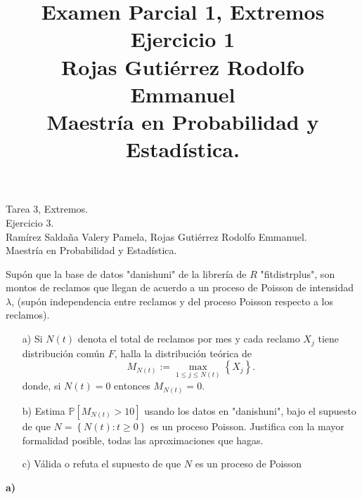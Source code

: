 \documentclass[10.5pt,notitlepage]{article}
\title{Examen Parcial 1, Extremos \\
Ejercicio 1\\
Rojas Gutiérrez Rodolfo Emmanuel\\ 
Maestría en Probabilidad y Estadística.}
\author{}
\newcommand{\PP}{\mathbb{P}}
\newcommand{\kis}[1]{\left\{ #1 \right\}}
\theoremstyle{plain}
\begin{document}
\begin{flushleft}
Tarea 3, Extremos.\\
Ejercicio 3.\\   
Ramírez Saldaña Valery Pamela, Rojas Gutiérrez Rodolfo Emmanuel.\\
Maestría en Probabilidad y Estadística.
\end{flushleft}
\setcounter{exo}{2}
\begin{exo}
Supón que la base de datos "danishuni" de la librería de \(R\) "fitdistrplus", son montos de reclamos que llegan de acuerdo a un proceso de Poisson de intensidad \(\lambda\), (supón independencia entre reclamos y del proceso Poisson respecto a los reclamos).
\begin{itemize}
    \item[a)] Si \(N(t)\) denota el total de reclamos por mes y cada reclamo \(X_j\) tiene distribución común \(F\), halla la distribución teórica de 
    \[
    M_{N(t)}:= \max_{1 \leq j \leq N(t)}\kis{X_{j}}.
    \]
    donde, si \(N(t) = 0\) entonces \(M_{N(t)} = 0\).
    \item[b)] Estima \(\PP[M_{N(t)} > 10]\) usando los datos en "danishuni", bajo el supuesto de que \(N = \kis{N(t):t \geq 0 }\) es un proceso Poisson. Justifica con la mayor formalidad posible, todas las aproximaciones que hagas.
    \item[c)] Válida o refuta el supuesto de que \(N\) es un proceso de Poisson
\end{itemize}
\end{exo}
\textbf{a)}
\end{document}
